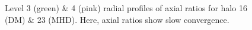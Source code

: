 \begin{figure}[!ht]
  \centering
  \hfill%
  \caption{Level 3 (green) \& 4 (pink) radial profiles of axial ratios for halo 16 (DM) \& 23 (MHD). Here, axial ratios show slow convergence. }
  \label{fig:badConvergence}
\end{figure}


